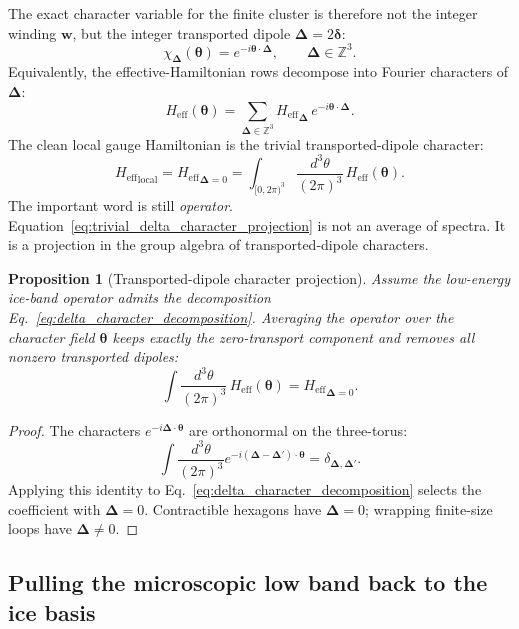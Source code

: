 \documentclass[11pt,letterpaper]{article}
\newcommand{\Heff}{H_{\mathrm{eff}}}
\newcommand{\bw}{\bm w}
\newcommand{\bdelta}{\bm \delta}
\newcommand{\bDelta}{\bm \Delta}
\newcommand{\btheta}{\bm \theta}
\newcommand{\Z}{\mathbb Z}
\theoremstyle{plain}
\newtheorem{proposition}{Proposition}
\theoremstyle{definition}
\begin{document}
The exact character variable for the finite cluster is therefore not the
integer winding $\bw$, but the integer transported dipole $\bDelta=2\bdelta$:
\begin{equation}
\chi_{\bDelta}(\btheta)=e^{-i\btheta\cdot\bDelta},
\qquad \bDelta\in\Z^3.
\label{eq:delta_character}
\end{equation}
Equivalently, the effective-Hamiltonian rows decompose into Fourier
characters of $\bDelta$:
\begin{equation}
\Heff(\btheta)=
\sum_{\bDelta\in\Z^3}{\Heff}_{\bDelta}\,
e^{-i\btheta\cdot\bDelta}.
\label{eq:delta_character_decomposition}
\end{equation}
The clean local gauge Hamiltonian is the trivial transported-dipole
character:
\begin{equation}
{\Heff}_{\mathrm{local}}={\Heff}_{\bDelta=0}
=\int_{[0,2\pi)^3}\frac{d^3\theta}{(2\pi)^3}\,\Heff(\btheta).
\label{eq:trivial_delta_character_projection}
\end{equation}
The important word is still \emph{operator}.  Equation~\eqref{eq:trivial_delta_character_projection}
is not an average of spectra.  It is a projection in the group algebra of
transported-dipole characters.

\begin{proposition}[Transported-dipole character projection]
Assume the low-energy ice-band operator admits the decomposition
Eq.~\eqref{eq:delta_character_decomposition}.  Averaging the operator over
the character field $\btheta$ keeps exactly the zero-transport component and
removes all nonzero transported dipoles:
\[
\int\frac{d^3\theta}{(2\pi)^3}\,\Heff(\btheta)={\Heff}_{\bDelta=0}.
\]
\end{proposition}

\begin{proof}
The characters $e^{-i\bDelta\cdot\btheta}$ are orthonormal on the
three-torus:
\[
\int\frac{d^3\theta}{(2\pi)^3}e^{-i(\bDelta-\bDelta')\cdot\btheta}
=\delta_{\bDelta,\bDelta'}.
\]
Applying this identity to Eq.~\eqref{eq:delta_character_decomposition}
selects the coefficient with $\bDelta=0$.  Contractible hexagons have
$\bDelta=0$; wrapping finite-size loops have $\bDelta\ne0$.
\end{proof}

\subsection{Pulling the microscopic low band back to the ice basis}
\end{document}
